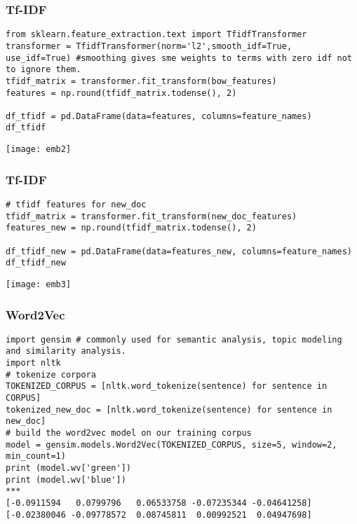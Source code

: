 \begin{frame}[fragile]\frametitle{Tf-IDF}
\begin{lstlisting}
from sklearn.feature_extraction.text import TfidfTransformer
transformer = TfidfTransformer(norm='l2',smooth_idf=True, use_idf=True) #smoothing gives sme weights to terms with zero idf not to ignore them.
tfidf_matrix = transformer.fit_transform(bow_features)
features = np.round(tfidf_matrix.todense(), 2)

df_tfidf = pd.DataFrame(data=features, columns=feature_names)
df_tfidf
\end{lstlisting}
\begin{center}
\texttt{[image: emb2]}
\end{center}
\end{frame}

\begin{frame}[fragile]\frametitle{Tf-IDF}
\begin{lstlisting}
# tfidf features for new_doc
tfidf_matrix = transformer.fit_transform(new_doc_features)
features_new = np.round(tfidf_matrix.todense(), 2)

df_tfidf_new = pd.DataFrame(data=features_new, columns=feature_names)
df_tfidf_new
\end{lstlisting}
\begin{center}
\texttt{[image: emb3]}
\end{center}
\end{frame}


\begin{frame}[fragile]\frametitle{Word2Vec}
\begin{lstlisting}
import gensim # commonly used for semantic analysis, topic modeling and similarity analysis.
import nltk
# tokenize corpora
TOKENIZED_CORPUS = [nltk.word_tokenize(sentence) for sentence in CORPUS]
tokenized_new_doc = [nltk.word_tokenize(sentence) for sentence in new_doc]
# build the word2vec model on our training corpus
model = gensim.models.Word2Vec(TOKENIZED_CORPUS, size=5, window=2, min_count=1)
print (model.wv['green'])
print (model.wv['blue'])
***
[-0.0911594   0.0799796   0.06533758 -0.07235344 -0.04641258]
[-0.02380046 -0.09778572  0.08745811  0.00992521  0.04947698]
\end{lstlisting}
\end{frame}

